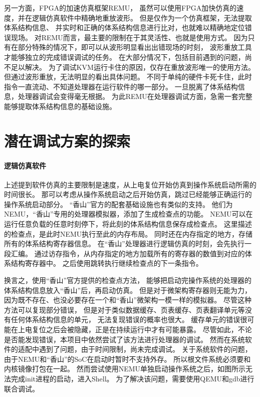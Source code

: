 另一方面，FPGA的加速仿真框架REMU，
虽然可以使用FPGA加快仿真的速度，并在逻辑仿真软件中精确地重放波形。
但是仅作为一个仿真框架，无法提取体系结构信息、
并实时和正确的体系结构信息进行比对，也就难以精确地定位错误现场。
对REMU而言，最主要的限制在于其灵活性、也就是使用方式。
因为只有在部分特殊的情况下，即可以从波形明显看出出错现场的时刻，
波形重放工具才能够独立的完成错误调试的任务。
在大部分情况下，包括目前遇到的问题，尚不足以解决。
为了调试KVM运行卡住的原因，仅存在重放波形唯一的使用方法。
但通过波形重放，无法明显的看出具体问题。
不同于单纯的硬件卡死卡住，此时指令一直流动、不知道处理器在运行软件的哪一部分。
一旦脱离了体系结构信息，处理器调试会变得毫无根据。
为此REMU在处理器调试方面，急需一套完整能够提取体系结构信息的基础设施。

\section{潜在调试方案的探索}

\paragraph{逻辑仿真软件}
上述提到软件仿真的主要限制是速度，从上电复位开始仿真到操作系统启动所需的时间很长。
那可以考虑从操作系统启动之后开始仿真，跳过已经能够正确运行的操作系统启动部分。
“香山”官方的配套基础设施也有类似的支持。
他们为NEMU，“香山”专用的处理器模拟器，添加了生成检查点的功能。
NEMU可以在运行任意负载的任意时刻停下，将此刻的体系结构信息保存成检查点。
这里描述的检查点，是此时NEMU执行至此的内存布局。
同时还在内存指定的地方，存储所有的体系结构寄存器信息。
在“香山”处理器进行逻辑仿真的时刻，会先执行一段汇编。
通过访存指令，从内存指定的地方加载所有的寄存器的数值到对应的体系结构寄存器中。
之后使用跳转执行继续检查点的下一条指令。

换言之，使用“香山”官方提供的检查点方法，
能够把启动完操作系统的处理器的体系结构信息放入“香山”后，再启动仿真。
但是对于微架构寄存器则无能为力，
因为既不存在、也没必要存在一个和“香山”微架构一模一样的模拟器。
尽管这种方法可以复现部分错误，
但是对于类似数据缓存、页表缓存、页表翻译单元等没有任何体系结构信息的单元，
无法复现错误的概率也很大。
缓存单元的错误很可能在上电复位之后会被隐藏，正是在持续运行中才有可能暴露。
尽管如此，不论是否能发现错误，本项目中依然尝试了该方法进行处理器的调试。
然而在系统软件的适配中遇到了问题，由于时间限制，尚未完成调试。
关于系统软件的问题，由于NEMU和“香山”的SoC在启动时暂时不支持外存。
所以根文件系统必须要和内核镜像打包在一起。
然而尝试使用NEMU单独启动操作系统之后，如图所示无法完成init进程的启动，进入Shell。
为了解决该问题，需要使用QEMU和gdb进行联合调试。

